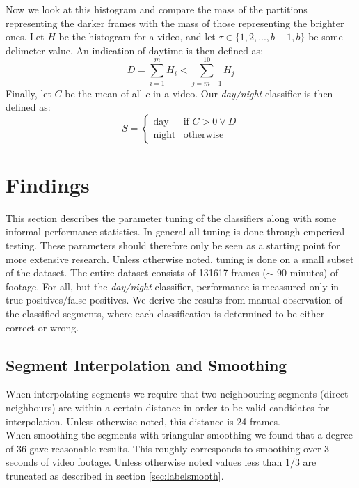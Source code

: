 %
Now we look at this histogram and compare the mass of the partitions representing the darker frames with the mass of those representing the brighter ones. Let $H$ be the histogram for a video, and let $\tau \in \{1,2,...,b-1,b\}$ be some delimeter value. An indication of daytime is then defined as:
%
\begin{equation}
D = \sum_{i=1}^{m}H_{i} < \sum_{j=m+1}^{10}H_{j}
\end{equation}
%
Finally, let $C$ be the mean of all $c$ in a video. Our \textit{day/night} classifier is then defined as:
\begin{equation}
S =
\begin{cases}
\text{day} & \text{if } C > 0 \vee D \\
\text{night} &  \text{otherwise}
\end{cases}
\end{equation}
%
%
\section{Findings}
%
This section describes the parameter tuning of the classifiers along with some informal performance statistics. In general all tuning is done through emperical testing. These parameters should therefore only be seen as a starting point for more extensive research. Unless otherwise noted, tuning is done on a small subset of the dataset. The entire dataset consists of 131617 frames ($\sim$ 90 minutes) of footage. For all, but the \textit{day/night} classifier, performance is meassured only in true positives/false positives. We derive the results from manual observation of the classified segments, where each classification is determined to be either correct or wrong.\\
%
\subsection{Segment Interpolation and Smoothing}
%
When interpolating segments we require that two neighbouring segments (direct neighbours) are within a certain distance in order to be valid candidates for interpolation. Unless otherwise noted, this distance is 24 frames.\\
When smoothing the segments with triangular smoothing we found that a degree of 36 gave reasonable results. This roughly corresponds to smoothing over 3 seconds of video footage. Unless otherwise noted values less than $1/3$ are truncated as described in section \ref{sec:labelsmooth}.
%
